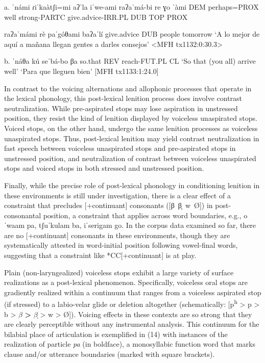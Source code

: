 a.	ˈnámi 	ɾiˈkaàtʃi=mi 	aʔˈla 	iˈwe-ami 	raʔaˈmá-bi 		re 	ɣo 	ˈàmi
	DEM	perhaps=PROX	well	strong-PARTC	give.advice-IRR.PL	DUB	TOP	PROX

	raʔaˈmámi 	rè 	paˈgóθami 	baʔaˈlí
	give.advice 	DUB	people		tomorrow
	‘A lo mejor de aquí a mañana llegan gentes a darles consejos’
	<MFH tx1132:0:30.3>

b.	ˈnáθa	kú	seˈbá-bo	βa
	so.that	REV	reach-FUT.PL	CL
	‘So that (you all) arrive well’
	‘Para que lleguen bien’
	[MFH tx1133:1:24.0]

In contrast to the voicing alternations and allophonic processes that operate in the lexical phonology, this post-lexical lenition process does involve contrast neutralization. While pre-aspirated stops may lose aspiration in unstressed position, they resist the kind of lenition displayed by voiceless unaspirated stops. Voiced stops, on the other hand, undergo the same lenition processes as voiceless unaspirated stops. Thus, post-lexical lenition may yield contrast neutralization in fast speech between voiceless unaspirated stops and pre-aspirated stops in unstressed position, and neutralization of contrast between voiceless unaspirated stops and voiced stops in both stressed and unstressed position.

Finally, while the precise role of post-lexical phonology in conditioning lenition in these environments is still under investigation, there is a clear effect of a constraint that precludes [+continuant] consonants ([β~β̞~w~Ø]) in post-consonantal position, a constraint that applies across word boundaries, e.g., oˈwaam pa, tʃuˈkulam ba, iˈserigam go. In the corpus data examined so far, there are no [+continuant] consonants in these environments, though they are systematically attested in word-initial position following vowel-final words, suggesting that a constraint like *CC[+continuant] is at play.


Plain (non-laryngealized) voiceless stops exhibit a large variety of surface realizations as a post-lexical phenomenon. Specifically, voiceless oral stops are gradiently realized within a continuum that ranges from a voiceless aspirated stop (if stressed) to a labio-velar glide or deletion altogether (schematically: [p\textsuperscript{h} > p > b > $\beta $\textbf{ > }$\beta ̩$ > w > Ø]). Voicing effects in these contexts are so strong that they are clearly perceptible without any instrumental analysis. This continuum for the bilabial place of articulation is exemplified in (14) with instances of the realization of particle \textit{pa} (in boldface), a monosyllabic function word that marks clause and/or utterance boundaries (marked with square brackets).


